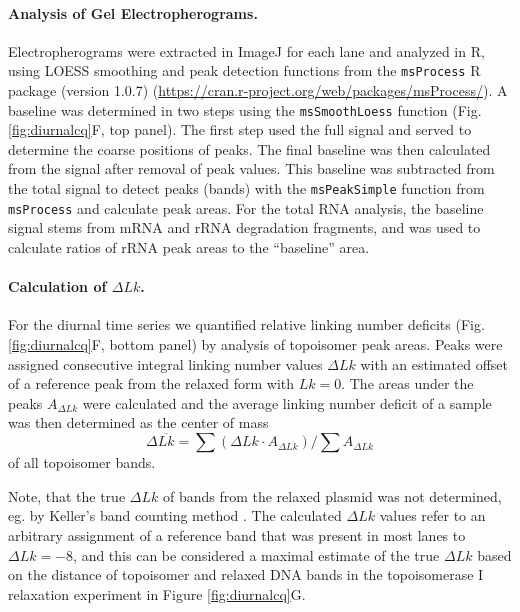 \documentclass[10pt,a4]{article}
\begin{document}
\paragraph{Analysis of Gel Electropherograms.}
Electropherograms were extracted in ImageJ for each lane and analyzed
in R, using LOESS smoothing and peak detection functions from the
\texttt{msProcess} R package (version 1.0.7)
(\url{https://cran.r-project.org/web/packages/msProcess/}). A baseline
was determined in two steps using the \texttt{msSmoothLoess} function
(Fig. \ref{fig:diurnalcq}F, top panel).  The first step used the full
signal and served to determine the coarse positions of peaks.  The
final baseline was then calculated from the signal after removal of
peak values. This baseline was subtracted from the total signal to
detect peaks (bands) with the \texttt{msPeakSimple} function from
\texttt{msProcess} and calculate peak areas.  For the total RNA
analysis, the baseline signal stems from mRNA and rRNA degradation
fragments, and was used to calculate ratios of rRNA peak areas to the
``baseline'' area.

\paragraph{Calculation of $\Delta Lk$.}
For the diurnal time series we quantified relative linking number
deficits (Fig. \ref{fig:diurnalcq}F, bottom panel) by analysis of
topoisomer peak areas.  Peaks were assigned consecutive
integral linking number values $\Delta Lk$ with an estimated offset of
a reference peak from the relaxed form with $Lk=0$. The areas under
the peaks $A_{\Delta Lk}$ were calculated and the average linking
number deficit of a sample was then determined as the center of mass
\begin{equation}
  \label{eq:dlk}
  \Delta \overline{Lk} = \sum{(\Delta Lk \cdot
    A_{\Delta Lk})}/\sum{A_{\Delta Lk}}
\end{equation}
of all topoisomer bands.

Note, that the true $\Delta Lk$ of bands from the relaxed plasmid was
not determined, eg. by Keller's band counting method
\cite{Keller1975b}.  The calculated $\Delta Lk$ values refer to an
arbitrary assignment of a reference band that was present in most
lanes to $\Delta Lk=-8$, and this can be considered a maximal estimate
of the true $\Delta Lk$ based on the distance of topoisomer and
relaxed DNA bands in the topoisomerase I relaxation experiment in
Figure \ref{fig:diurnalcq}G.


\setlength{\bibsep}{0.0pt}
\begin{spacing}{0.9}
  
\end{spacing}
\end{document}
